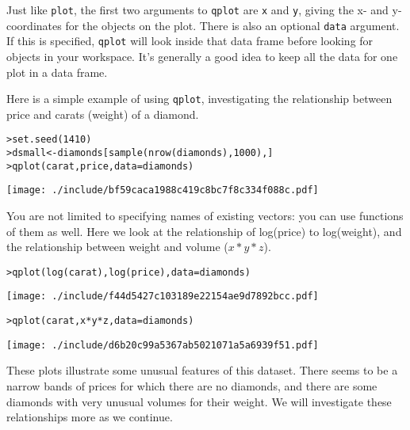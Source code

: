 Just like {\tt plot}, the first two arguments to {\tt qplot} are {\tt x} and {\tt y}, giving the x- and y-coordinates for the objects on the plot. There is also an optional {\tt data} argument.  If this is specified, {\tt qplot} will look inside that data frame before looking for objects in your workspace.  It's generally a good idea to keep all the data for one plot in a data frame.

Here is a simple example of using {\tt qplot}, investigating the relationship between price and carats (weight) of a diamond.  

\begin{alltt}
> set.seed(1410)
> dsmall <- diamonds[sample(nrow(diamonds), 1000), ]
> qplot(carat, price, data = diamonds)
\end{alltt}
\texttt{[image: ./include/bf59caca1988c419c8bc7f8c334f088c.pdf]}
\begin{alltt}

\end{alltt}

You are not limited to specifying names of existing vectors: you can use functions of them as well.  Here we look at the relationship of log(price) to log(weight), and the relationship between weight and volume ($x * y * z$).

\begin{alltt}
> qplot(log(carat), log(price), data = diamonds)
\end{alltt}
\texttt{[image: ./include/f44d5427c103189e22154ae9d7892bcc.pdf]}
\begin{alltt}

> qplot(carat, x * y * z, data = diamonds)
\end{alltt}
\texttt{[image: ./include/d6b20c99a5367ab5021071a5a6939f51.pdf]}
\begin{alltt}

\end{alltt}

These plots illustrate some unusual features of this dataset.  There seems to be a narrow bands of prices for which there are no diamonds, and there are some diamonds with very unusual volumes for their weight.  We will investigate these relationships more as we continue.

